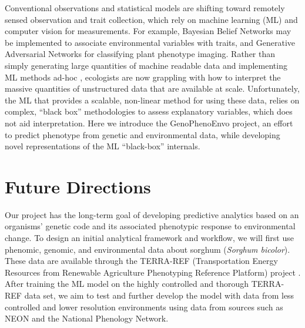 \documentclass[11pt,]{article}
\begin{document}
Conventional observations and statistical models are shifting toward
remotely sensed observation and trait collection, which rely on machine
learning (ML) and computer vision for measurements. For example,
Bayesian Belief Networks \citep{cooper1990computational} may be
implemented to associate environmental variables with traits, and
Generative Adversarial Networks \citep{radford2015unsupervised} for
classifying plant phenotype imaging. Rather than simply generating large
quantities of machine readable data \citep{hampton2013big} and
implementing ML methods ad-hoc \citep{pichler2020machine}, ecologists
are now grappling with how to interpret the massive quantities of
unstructured data that are available at scale. Unfortunately, the ML
that provides a scalable, non-linear method for using these data, relies
on complex, ``black box'' methodologies to assess explanatory variables,
which does not aid interpretation. Here we introduce the GenoPhenoEnvo
project, an effort to predict phenotype from genetic and environmental
data, while developing novel representations of the ML ``black-box''
internals.

\hypertarget{future-directions}{%
\section{Future Directions}\label{future-directions}}

Our project has the long-term goal of developing predictive analytics
based on an organisms' genetic code and its associated phenotypic
response to environmental change. To design an initial analytical
framework and workflow, we will first use phenomic, genomic, and
environmental data about sorghum (\emph{Sorghum bicolor}). These data
are available through the TERRA-REF (Transportation Energy Resources
from Renewable Agriculture Phenotyping Reference Platform) project
\citep{lebauer2020data, burnette2018terra}. After training the ML model
on the highly controlled and thorough TERRA-REF data set, we aim to test
and further develop the model with data from less controlled and lower
resolution environments using data from sources such as NEON and the
National Phenology Network.
\end{document}
